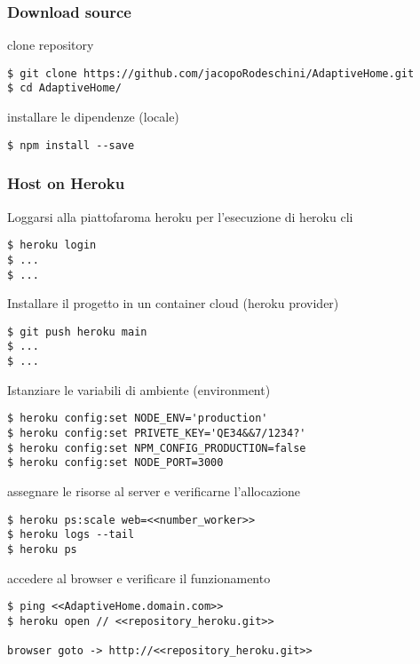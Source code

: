 \documentclass[onecolumn,a4paper]{article}
\begin{document}
\subsubsection{Download source}
\label{sec:orgb61a2f9}

clone repository 
\begin{verbatim}
$ git clone https://github.com/jacopoRodeschini/AdaptiveHome.git
$ cd AdaptiveHome/
\end{verbatim}

installare le dipendenze (locale)

\begin{verbatim}
$ npm install --save
\end{verbatim}

\subsubsection{Host on Heroku}
\label{sec:org89432ee}

Loggarsi alla piattofaroma heroku per l'esecuzione di heroku cli

\begin{verbatim}
$ heroku login
$ ...
$ ...
\end{verbatim}
Installare il progetto in un container cloud (heroku provider)
\begin{verbatim}
$ git push heroku main
$ ...
$ ...
\end{verbatim}
Istanziare le variabili di ambiente (environment)
\begin{verbatim}
$ heroku config:set NODE_ENV='production'
$ heroku config:set PRIVETE_KEY='QE34&&7/1234?'
$ heroku config:set NPM_CONFIG_PRODUCTION=false
$ heroku config:set NODE_PORT=3000
\end{verbatim}
assegnare le risorse al server e verificarne l'allocazione
\begin{verbatim}
$ heroku ps:scale web=<<number_worker>>
$ heroku logs --tail
$ heroku ps
\end{verbatim}
accedere al browser e verificare il funzionamento
\begin{verbatim}
$ ping <<AdaptiveHome.domain.com>>
$ heroku open // <<repository_heroku.git>>

browser goto -> http://<<repository_heroku.git>>
\end{verbatim}
\end{document}
